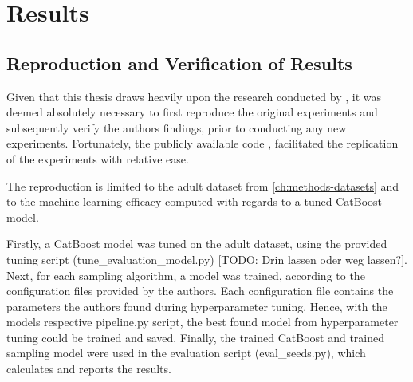 \chapter{Results}
\label{ch:results}

\section{Reproduction and Verification of Results}
\label{ch:results-reproduction}

Given that this thesis draws heavily upon the research conducted by \cite{kotelnikov2022TabDDPMModellingTabular},
it was deemed absolutely necessary to first reproduce the original experiments and subsequently verify the authors findings,
prior to conducting any new experiments.
Fortunately, the publicly available code \cite{akim2023TabDDPMModellingTabular}, facilitated the replication of the experiments with relative ease.

The reproduction is limited to the adult dataset from \autoref{ch:methods-datasets} and to the machine learning efficacy computed with regards to a tuned CatBoost \cite{prokhorenkova2018CatBoostUnbiasedBoosting} model.

Firstly, a CatBoost model was tuned on the adult dataset, using the provided tuning script (tune\_evaluation\_model.py) [TODO: Drin lassen oder weg lassen?].
Next, for each sampling algorithm, a model was trained, according to the configuration files provided by the authors.
Each configuration file contains the parameters the authors found during hyperparameter tuning.
Hence, with the models respective pipeline.py script, the best found model from hyperparameter tuning could be trained and saved.
Finally, the trained CatBoost and trained sampling model were used in the evaluation script (eval\_seeds.py), which calculates and reports the results.

